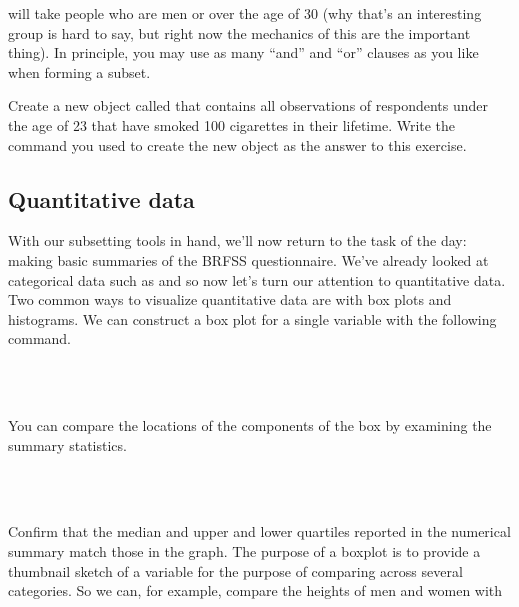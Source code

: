 \documentclass[11pt]{article}
\begin{document}
will take people who are men or over the age of 30 (why that's an interesting group is hard to say, but right now the mechanics of this are the important thing). In principle, you may use as many ``and'' and ``or'' clauses as you like when forming a subset.

\begin{exercise}
Create a new object called \texttt{} that contains all observations of respondents under the age of 23 that have smoked 100 cigarettes in their lifetime. Write the command you used to create the new object as the answer to this exercise.
\end{exercise}

\subsection*{Quantitative data}

With our subsetting tools in hand, we'll now return to the task of the day: making basic summaries of the BRFSS questionnaire.  We've already looked at categorical data such as \texttt{} and \texttt{} so now let's turn our attention to quantitative data.  Two common ways to visualize quantitative data are with box plots and histograms.  We can construct a box plot for a single variable with the following command.

\ttfamily\noindent
\hlstd{}\hspace*{\fill}\\
\hlstd{}\hlkeyword{(}\hlkeyword{\usebox{\hlnormalsizeboxdollar}}\hlkeyword{)}\hspace*{\fill}\\
\normalfont

You can compare the locations of the components of the box by examining the summary statistics.

\ttfamily\noindent
\hlstd{}\hspace*{\fill}\\
\hlstd{}\hlkeyword{(}\hlkeyword{\usebox{\hlnormalsizeboxdollar}}\hlkeyword{)}\hspace*{\fill}\\
\normalfont

Confirm that the median and upper and lower quartiles reported in the numerical summary match those in the graph. The purpose of a boxplot is to provide a thumbnail sketch of a variable for the purpose of comparing across several categories. So we can, for example, compare the heights of men and women with 
\end{document}
